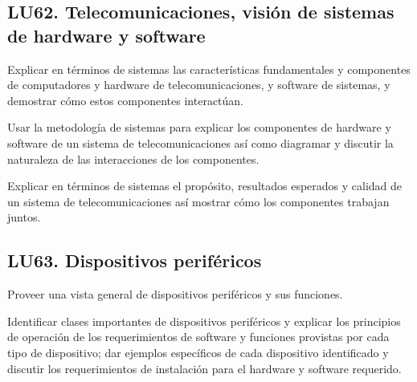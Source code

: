 \subsection{LU62. Telecomunicaciones, visión de sistemas de hardware y software}\label{sec:BOK-LU62}\label{sec:LU62}
\begin{LearningUnit}
\begin{LUGoal}
\item Explicar en términos de sistemas las características fundamentales y componentes de computadores y hardware de telecomunicaciones, y software de sistemas, y demostrar cómo estos componentes interactúan.
\end{LUGoal}

\begin{LUObjective}
\item Usar la metodología de sistemas para explicar los componentes de hardware y software de un sistema de telecomunicaciones así como diagramar y discutir la naturaleza de las interacciones de los componentes.
\item Explicar en términos de sistemas el propósito, resultados esperados y calidad de un sistema de telecomunicaciones así mostrar cómo los componentes trabajan juntos.
\end{LUObjective}
\end{LearningUnit}

\subsection{LU63. Dispositivos periféricos}\label{sec:BOK-LU63}\label{sec:LU63}
\begin{LearningUnit}
\begin{LUGoal}
\item Proveer una vista general de dispositivos periféricos y sus funciones.
\end{LUGoal}

\begin{LUObjective}
\item Identificar clases importantes de dispositivos periféricos y explicar los principios de operación de los requerimientos de software y funciones provistas por cada tipo de dispositivo; dar ejemplos específicos de cada dispositivo identificado y discutir los requerimientos de instalación para el hardware y software requerido.
\end{LUObjective}
\end{LearningUnit}

